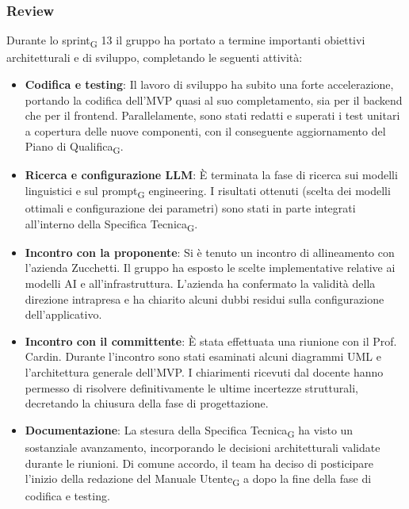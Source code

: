 \documentclass[11pt,a4paper]{article}
\newcommand{\gls}[1]{#1\textsubscript{G}}
\begin{document}
\subsubsection{Review}
Durante lo \gls{sprint} 13 il gruppo ha portato a termine importanti obiettivi architetturali e di sviluppo, completando le seguenti attività:
\begin{itemize}
    \item \textbf{Codifica e testing}: Il lavoro di sviluppo ha subito una forte accelerazione, portando la codifica dell'MVP quasi al suo completamento, sia per il backend che per il frontend. Parallelamente, sono stati redatti e superati i test unitari a copertura delle nuove componenti, con il conseguente aggiornamento del \gls{Piano di Qualifica}.
    \item \textbf{Ricerca e configurazione LLM}: È terminata la fase di ricerca sui modelli linguistici e sul \gls{prompt} engineering. I risultati ottenuti (scelta dei modelli ottimali e configurazione dei parametri) sono stati in parte integrati all'interno della \gls{Specifica Tecnica}.
    \item \textbf{Incontro con la proponente}: Si è tenuto un incontro di allineamento con l'azienda Zucchetti. Il gruppo ha esposto le scelte implementative relative ai modelli AI e all'infrastruttura. L'azienda ha confermato la validità della direzione intrapresa e ha chiarito alcuni dubbi residui sulla configurazione dell'applicativo.
    \item \textbf{Incontro con il committente}: È stata effettuata una riunione con il Prof. Cardin. Durante l'incontro sono stati esaminati alcuni diagrammi UML e l'architettura generale dell'MVP. I chiarimenti ricevuti dal docente hanno permesso di risolvere definitivamente le ultime incertezze strutturali, decretando la chiusura della fase di progettazione.
    \item \textbf{Documentazione}: La stesura della \gls{Specifica Tecnica} ha visto un sostanziale avanzamento, incorporando le decisioni architetturali validate durante le riunioni. Di comune accordo, il team ha deciso di posticipare l'inizio della redazione del \gls{Manuale Utente} a dopo la fine della fase di codifica e testing.
\end{itemize}
\end{document}
